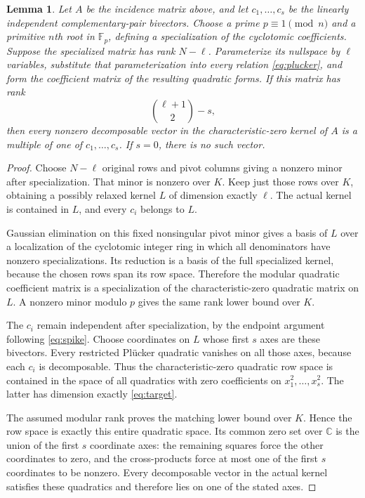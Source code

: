 \documentclass[11pt]{article}
\newtheorem{lemma}[theorem]{Lemma}
\theoremstyle{definition}
\newcommand{\C}{\mathbb C}
\newcommand{\Fp}{\mathbb F_p}
\begin{document}
\begin{lemma}\label{lem:modular}
Let $A$ be the incidence matrix above, and let $c_1,\ldots,c_s$ be the linearly independent complementary-pair bivectors. Choose a prime $p\equiv1\pmod n$ and a primitive $n$th root in $\Fp$, defining a specialization of the cyclotomic coefficients. Suppose the specialized matrix has rank $N-\ell$. Parameterize its nullspace by $\ell$ variables, substitute that parameterization into every relation \eqref{eq:plucker}, and form the coefficient matrix of the resulting quadratic forms. If this matrix has rank
\begin{equation}\label{eq:target}
 \binom{\ell+1}{2}-s,
\end{equation}
then every nonzero decomposable vector in the characteristic-zero kernel of $A$ is a multiple of one of $c_1,\ldots,c_s$. If $s=0$, there is no such vector.
\end{lemma}
\begin{proof}
Choose $N-\ell$ original rows and pivot columns giving a nonzero minor after specialization. That minor is nonzero over $K$. Keep just those rows over $K$, obtaining a possibly relaxed kernel $L$ of dimension exactly $\ell$. The actual kernel is contained in $L$, and every $c_i$ belongs to $L$.

Gaussian elimination on this fixed nonsingular pivot minor gives a basis of $L$ over a localization of the cyclotomic integer ring in which all denominators have nonzero specializations. Its reduction is a basis of the full specialized kernel, because the chosen rows span its row space. Therefore the modular quadratic coefficient matrix is a specialization of the characteristic-zero quadratic matrix on $L$. A nonzero minor modulo $p$ gives the same rank lower bound over $K$.

The $c_i$ remain independent after specialization, by the endpoint argument following \eqref{eq:spike}. Choose coordinates on $L$ whose first $s$ axes are these bivectors. Every restricted Pl\"ucker quadratic vanishes on all those axes, because each $c_i$ is decomposable. Thus the characteristic-zero quadratic row space is contained in the space of all quadratics with zero coefficients on $x_1^2,\ldots,x_s^2$. The latter has dimension exactly \eqref{eq:target}.

The assumed modular rank proves the matching lower bound over $K$. Hence the row space is exactly this entire quadratic space. Its common zero set over $\C$ is the union of the first $s$ coordinate axes: the remaining squares force the other coordinates to zero, and the cross-products force at most one of the first $s$ coordinates to be nonzero. Every decomposable vector in the actual kernel satisfies these quadratics and therefore lies on one of the stated axes.
\end{proof}
\end{document}
